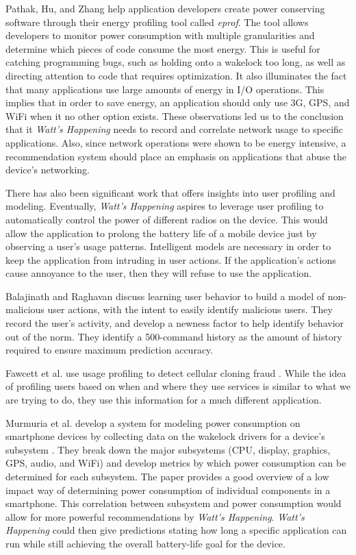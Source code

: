 Pathak, Hu, and Zhang help application developers create power conserving software through their energy profiling tool called \emph{eprof}\cite{Pathak:2012:ESI:2168836.2168841}. 
The tool allows developers to monitor power consumption with multiple granularities and determine which pieces of code consume the most energy. 
This is useful for catching programming bugs, such as holding onto a wakelock too long, as well as directing attention to code that requires optimization. 
It also illuminates the fact that many applications use large amounts of energy in I/O operations. 
This implies that in order to save energy, an application should only use 3G, GPS, and WiFi when it no other option exists.
These observations led us to the conclusion that it \emph{Watt's Happening} needs to record and correlate network usage to specific applications.
Also, since network operations were shown to be energy intensive, a recommendation system should place an emphasis on applications that abuse the device's networking.

There has also been significant work that offers insights into user profiling and modeling.
Eventually, \emph{Watt's Happening} aspires to leverage user profiling to automatically control the power of different radios on the device. 
This would allow the application to prolong the battery life of a mobile device just by observing a user's usage patterns.
Intelligent models are necessary in order to keep the application from intruding in user actions.
If the application's actions cause annoyance to the user, then they will refuse to use the application. 

Balajinath and Raghavan discuss learning user behavior to build a model of non-malicious user actions, with the intent to easily identify malicious users\cite{Balajinath:2001:IDT:2294491.2294970}. 
They record the user's activity, and develop a newness factor to help identify behavior out of the norm. 
They identify a 500-command history as the amount of history required to ensure maximum prediction accuracy. 

Fawcett et al. use usage profiling to detect cellular cloning fraud \cite{dataMiningFraudDetection}. 
While the idea of profiling users based on when and where they use services is similar to what we are trying to do, they use this information for a much different application. 

Murmuria et al. develop a system for modeling power consumption on smartphone devices by collecting data on the wakelock drivers for a device's subsystem \cite{mobilePowerUsageMeasurements}. 
They break down the major subsystems (CPU, display, graphics, GPS, audio, and WiFi) and develop metrics by which power consumption can be determined for each subsystem. 
The paper provides a good overview of a low impact way of determining power consumption of individual components in a smartphone.
This correlation between subsystem and power consumption would allow for more powerful recommendations by \emph{Watt's Happening}.
\emph{Watt's Happening} could then give predictions stating how long a specific application can run while still achieving the overall battery-life goal for the device.

